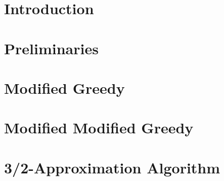 \newcommand\todo[1]{\textcolor{red}{TODO #1}\newline}


\section{Introduction}

\section{Preliminaries}

\section{Modified Greedy}

\section{Modified Modified Greedy}

\section{3/2-Approximation Algorithm}

